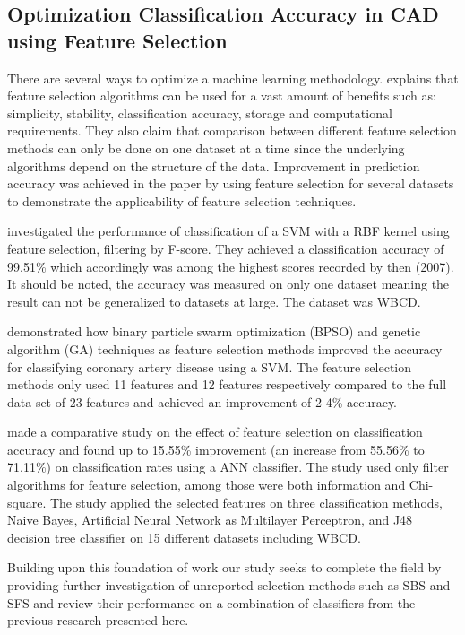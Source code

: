 \subsection{Optimization Classification Accuracy in CAD using Feature Selection}


There are several ways to optimize a machine learning methodology. \textcite{c201416} explains that feature selection algorithms can be used for a vast amount of benefits such as: simplicity, stability, classification accuracy, storage and computational requirements. They also claim that comparison between different feature selection methods can only be done on one dataset at a time since the underlying algorithms depend on the structure of the data. Improvement in prediction accuracy was achieved in the paper by using feature selection for several datasets to demonstrate the applicability of feature selection techniques.

\textcite{akay2009} investigated the performance of classification of a SVM with a RBF kernel using feature selection, filtering by F-score. They achieved a classification accuracy of 99.51\% which accordingly was among the highest scores recorded by then (2007). It should be noted, the accuracy was measured on only one dataset meaning the result can not be generalized to datasets at large. The dataset was WBCD.

\textcite{b20103177} demonstrated how  binary particle swarm optimization (BPSO) and genetic algorithm (GA) techniques as feature selection methods improved the accuracy for classifying coronary artery disease using a SVM. The feature selection methods only used 11 features and 12 features respectively compared to the full data set of 23 features and achieved an improvement of 2-4\% accuracy.

\textcite{karabulut2012} made a comparative study on the effect of feature selection on classification accuracy and found up to 15.55\% improvement (an increase from 55.56\% to 71.11\%) on classification rates using a ANN classifier. The study used only filter algorithms for feature selection, among those were both information and Chi-square. The study applied the selected features on three classification methods, Naive Bayes, Artificial Neural Network as Multilayer Perceptron, and J48 decision tree classifier on 15 different datasets including WBCD.

Building upon this foundation of work our study seeks to complete the field by providing further investigation of unreported selection methods such as SBS and SFS and review their performance on a combination of classifiers from the previous research presented here.
